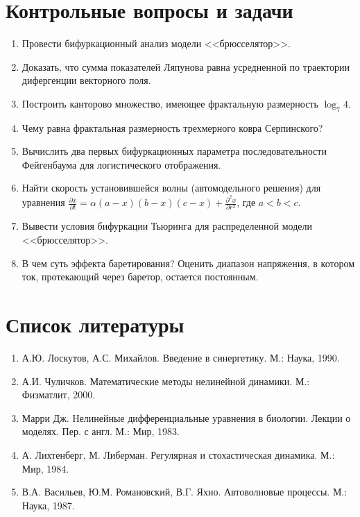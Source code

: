 \documentclass[12pt, twoside, a4paper]{article}
\theoremstyle{definition}
\begin{document}
\section{Контрольные вопросы и задачи}
\begin{enumerate}
    \item Провести бифуркационный анализ модели <<брюсселятор>>.
    \item Доказать, что сумма показателей Ляпунова равна усредненной по траектории дифергенции векторного поля.
    \item Построить канторово множество, имеющее фрактальную размерность $\log_{7} 4$.
    \item Чему равна фрактальная размерность трехмерного ковра Серпинского?
    \item Вычислить два первых бифуркационных параметра последовательности Фейгенбаума для логистического отображения.
    \item Найти скорость установившейся волны (автомодельного решения) для уравнения $\frac{\partial x}{\partial t} = \alpha (a-x)(b-x)(c-x) + \frac{\partial^2 x}{\partial r^2}$, где $a < b < c$.
    \item Вывести условия бифуркации Тьюринга для распределенной модели <<брюсселятор>>.
    \item В чем суть эффекта баретирования? Оценить диапазон напряжения, в котором ток, протекающий через баретор, остается постоянным.
\end{enumerate}
\section{Список литературы}
\begin{enumerate}
    \item А.Ю. Лоскутов, А.С. Михайлов. Введение в синергетику. М.: Наука, 1990.
    \item А.И. Чуличков. Математические методы нелинейной динамики. М.: Физматлит, 2000.
    \item Марри Дж. Нелинейные дифференциальные уравнения в биологии. Лекции о моделях. Пер. с англ. М.: Мир, 1983.
    \item А. Лихтенберг, М. Либерман. Регулярная и стохастическая динамика. М.: Мир, 1984.
    \item В.А. Васильев, Ю.М. Романовский, В.Г. Яхно. Автоволновые процессы. М.: Наука, 1987.
\end{enumerate}
\end{document}
